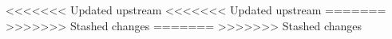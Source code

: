 \def\xxactivite{\ifprof TP -- Corrigé  \else  TP \fi}
\def\xxauteur{\textsl{É. Durif -- X. Pessoles -- J.-P. Berne}}



\def\xxYCartouche{-2.25cm}
\def\xxYongletGarde{.5cm}
\def\xxYOnget{.9cm}





\def\xxfigures{
}%




\setlength{\columnseprule}{.1pt}

\pagestyle{fancy}
\thispagestyle{plain}


<<<<<<< Updated upstream
<<<<<<< Updated upstream
\vspace{4.5cm}
\vspace{3.5cm}
\vspace{3.5cm}
=======
\vspace{3.5cm}
>>>>>>> Stashed changes
=======
\vspace{3.5cm}
>>>>>>> Stashed changes

\def\columnseprulecolor{\color{ocre}}
\setlength{\columnseprule}{0.4pt} 


\setcounter{exo}{0}
\vspace{3cm}






